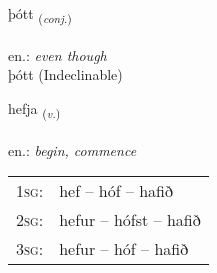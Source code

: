 \documentclass[frontgrid, backgrid]{flacards}\usepackage[]{graphicx}\usepackage[]{xcolor}
\begin{document}

\renewcommand{\flhead}{\vskip5pt \fboxsep=0pt {\small\bfseries\footnotesize Samtenging | Conjuction}}
\renewcommand{\fcfoot}{\vskip5pt \fboxsep=0pt \hspace{2pt}{\small\bfseries\footnotesize 1K}}

\renewcommand{\blhead}{\vskip5pt {\small\bfseries\footnotesize Samtenging | Conjuction }}
\renewcommand{\bcfoot}{\vskip5pt \hspace{2pt}{\small\bfseries\footnotesize 1K}}


{þótt \small{\textsubscript{(\textit{conj.})}} \\[1ex]
\textphonetic{[θouht]} \\
en.: \emph{even though} \\  [2ex]
þótt (Indeclinable)}

\renewcommand{\flhead}{\vskip5pt \fboxsep=0pt {\small\bfseries\footnotesize Sagnorð | Verb}}
\renewcommand{\fcfoot}{\vskip5pt \fboxsep=0pt \hspace{2pt}{\small\bfseries\footnotesize 1K}}

\renewcommand{\blhead}{\vskip5pt {\small\bfseries\footnotesize Sagnorð | Verb }}
\renewcommand{\bcfoot}{\vskip5pt \hspace{2pt}{\small\bfseries\footnotesize 1K}}


{hefja \small{\textsubscript{(\textit{v.})}} \\[1ex] %
\textphonetic{[hɛvja]} \\
en.: \emph{begin, commence} \\  [2ex]
\renewcommand*{\arraystretch}{0.8}
\begin{tabular}{p{1cm}l}
\textsc{1sg}: & hef -- hóf -- hafið \\ 
\textsc{2sg}: & hefur -- hófst -- hafið \\ 
\textsc{3sg}: & hefur -- hóf -- hafið \\ 
\end{tabular}
}

\end{document}

